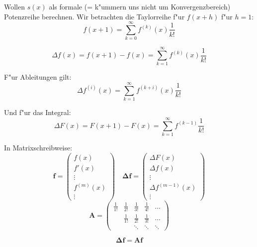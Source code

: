 \documentclass[german, 10pt, a4paper, twocolumn]{scrartcl}
\theoremstyle{definition}
\begin{document}
Wollen $s(x)$ als formale (= k"ummern uns nicht um Konvergenzbereich) Potenzreihe berechnen. Wir betrachten die Taylorreihe f"ur $f(x+h)$ f"ur $h=1$:
\begin{displaymath}
	f(x+1) = \sum^{\infty}_{k=0} f^{(k)}(x)\frac{1}{k!}
\end{displaymath}

\begin{displaymath}
	\Delta f(x) = f(x+1) - f(x) = \sum^\infty_{k=1} f^{(k)}(x) \frac{1}{k!}
\end{displaymath}

F"ur Ableitungen gilt:
\begin{displaymath}
	\Delta f^{(i)}(x) = \sum^\infty_{k=1} f^{(k+i)}(x) \frac{1}{k!}
\end{displaymath}

Und f"ur das Integral:
\begin{displaymath}
	\Delta F(x) = F(x+1) - F(x) = \sum^{\infty}_{k=1} f^{(k-1)}\frac{1}{k!}
\end{displaymath}

In Matrixschreibweise:
\begin{displaymath}
	\mathbf{f} = \left ( 
	\begin{array}{c}
		f(x)\\
		f'(x)\\
		\vdots\\
		f^{(m)}(x)\\
		\vdots
	\end{array}
	\right )
	\quad
	\mathbf{\Delta f} = \left ( 
	\begin{array}{c}
		\Delta F(x)\\
		\Delta f(x)\\
		\vdots\\
		\Delta f^{(m-1)}(x)\\
		\vdots
	\end{array}
	\right )
\end{displaymath}
\begin{displaymath}
	\mathbf{A} = \left (
	\begin{array}{ccccc}
		\frac{1}{1!} &	\frac{1}{2!} &	\frac{1}{3!} &	\frac{1}{4!} &	\hdots\\
		&		\frac{1}{1!} &  \frac{1}{2!} &  \frac{1}{3!} &	\hdots\\
		&		&		\ddots &	\ddots &	\ddots
	\end{array}
	\right )
\end{displaymath}

\begin{displaymath}
	\mathbf{\Delta f} = \mathbf{A}\mathbf{f}
\end{displaymath}
\end{document}
